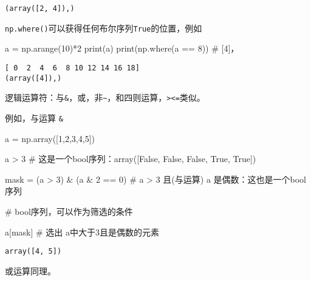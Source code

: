 \documentclass[
  letterpaper,
  DIV=11,
  numbers=noendperiod]{scrreprt}
\newenvironment{Shaded}{\begin{snugshade}}{\end{snugshade}}
\newcommand{\BuiltInTok}[1]{\textcolor[rgb]{0.00,0.23,0.31}{#1}}
\newcommand{\CommentTok}[1]{\textcolor[rgb]{0.37,0.37,0.37}{#1}}
\newcommand{\DecValTok}[1]{\textcolor[rgb]{0.68,0.00,0.00}{#1}}
\newcommand{\NormalTok}[1]{\textcolor[rgb]{0.00,0.23,0.31}{#1}}
\newcommand{\OperatorTok}[1]{\textcolor[rgb]{0.37,0.37,0.37}{#1}}
\begin{document}
\begin{verbatim}
(array([2, 4]),)
\end{verbatim}

\texttt{np.where()}可以获得任何布尔序列\texttt{True}的位置，例如

\begin{Shaded}
\begin{Highlighting}[]
\NormalTok{a }\OperatorTok{=}\NormalTok{ np.arange(}\DecValTok{10}\NormalTok{)}\OperatorTok{*}\DecValTok{2}
\BuiltInTok{print}\NormalTok{(a)}
\BuiltInTok{print}\NormalTok{(np.where(a }\OperatorTok{==} \DecValTok{8}\NormalTok{)) }\CommentTok{\# [4]， }
\end{Highlighting}
\end{Shaded}

\begin{verbatim}
[ 0  2  4  6  8 10 12 14 16 18]
(array([4]),)
\end{verbatim}

逻辑运算符：与\texttt{\&}，或\texttt{\textbar{}}，非\texttt{\textasciitilde{}}，和四则运算，\texttt{\textgreater{}\textless{}=}类似。

例如，与运算 \texttt{\&}

\begin{Shaded}
\begin{Highlighting}[]
\NormalTok{a }\OperatorTok{=}\NormalTok{ np.array([}\DecValTok{1}\NormalTok{,}\DecValTok{2}\NormalTok{,}\DecValTok{3}\NormalTok{,}\DecValTok{4}\NormalTok{,}\DecValTok{5}\NormalTok{])}

\NormalTok{a }\OperatorTok{\textgreater{}} \DecValTok{3} \CommentTok{\# 这是一个bool序列：array([False, False, False,  True,  True])}

\NormalTok{mask }\OperatorTok{=}\NormalTok{ (a }\OperatorTok{\textgreater{}} \DecValTok{3}\NormalTok{) }\OperatorTok{\&}\NormalTok{ (a }\OperatorTok{\&} \DecValTok{2} \OperatorTok{==} \DecValTok{0}\NormalTok{)  }
\CommentTok{\# a \textgreater{} 3 且(与运算) a 是偶数：这也是一个bool序列}

\CommentTok{\# bool序列，可以作为筛选的条件}

\NormalTok{a[mask] }\CommentTok{\# 选出 a中大于3且是偶数的元素}
\end{Highlighting}
\end{Shaded}

\begin{verbatim}
array([4, 5])
\end{verbatim}

或运算同理。
\end{document}
